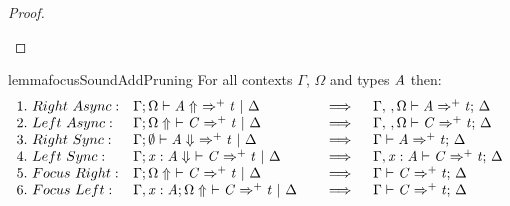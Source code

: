 \begin{proof}
\begin{enumerate}
  \end{enumerate}
\end{proof}

\begin{restatable}{lemma}{focusSoundAddPruning}
For all contexts $\Gamma$, $\Omega$ and types $\mathit{A}$
then:
\begin{align*}
\begin{array}{lll}
 1.\ Right\ Async: & \Gamma  ;  \Omega  \vdash   \GRANULEnt{A}  \Uparrow\   \Rightarrow^{+}  \GRANULEnt{t}  \ | \  \Delta \quad &\implies \quad \Gamma  \GRANULEsym{,}  \,  \GRANULEsym{,}  \Omega  \vdash  \GRANULEnt{A}  \Rightarrow^+  \GRANULEnt{t}  ;\,  \Delta\\
 2.\ Left\ Async: & \Gamma  ;   \Omega  \Uparrow\   \vdash  \GRANULEnt{C}  \Rightarrow^{+}  \GRANULEnt{t}  \ | \  \Delta \quad &\implies \quad \Gamma  \GRANULEsym{,}  \,  \GRANULEsym{,}  \Omega  \vdash  \GRANULEnt{C}  \Rightarrow^+  \GRANULEnt{t}  ;\,  \Delta\\
 3.\ Right\ Sync: & \Gamma  ;   \emptyset   \vdash   \GRANULEnt{A}  \Downarrow\   \Rightarrow^{+}  \GRANULEnt{t}  \ | \  \Delta \quad &\implies \quad \Gamma  \vdash  \GRANULEnt{A}  \Rightarrow^+  \GRANULEnt{t}  ;\,  \Delta\\
 4.\ Left\ Sync: & \Gamma  ;     \GRANULEmv{x}  :  \GRANULEnt{A}    \Downarrow\   \vdash  \GRANULEnt{C}  \Rightarrow^{+}  \GRANULEnt{t}  \ | \  \Delta \quad &\implies \quad \Gamma  \GRANULEsym{,}   \GRANULEmv{x}  :  \GRANULEnt{A}   \vdash  \GRANULEnt{C}  \Rightarrow^+  \GRANULEnt{t}  ;\,  \Delta\\
 5.\ Focus\ Right: & \Gamma  ;   \Omega  \Uparrow\   \vdash  \GRANULEnt{C}  \Rightarrow^{+}  \GRANULEnt{t}  \ | \  \Delta \quad &\implies \quad \Gamma  \vdash  \GRANULEnt{C}  \Rightarrow^+  \GRANULEnt{t}  ;\,  \Delta\\
 6.\ Focus\ Left: & \Gamma  \GRANULEsym{,}   \GRANULEmv{x}  :  \GRANULEnt{A}   ;   \Omega  \Uparrow\   \vdash  \GRANULEnt{C}  \Rightarrow^{+}  \GRANULEnt{t}  \ | \  \Delta \quad &\implies \quad \Gamma  \vdash  \GRANULEnt{C}  \Rightarrow^+  \GRANULEnt{t}  ;\,  \Delta
\end{array}
\end{align*}
\end{restatable}
